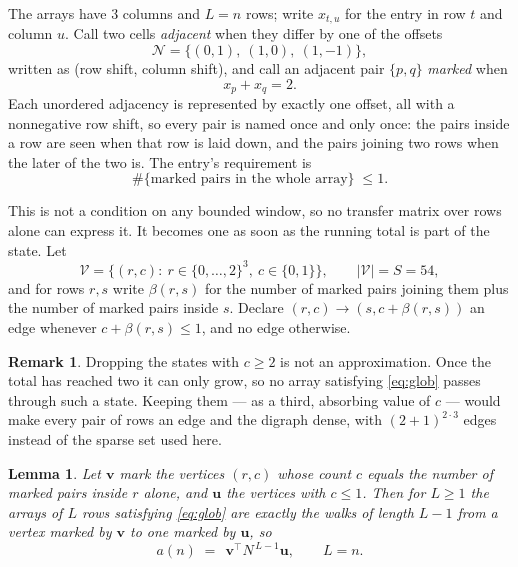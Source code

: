 \documentclass[11pt,a4paper]{article}
\theoremstyle{plain}
\newtheorem{lemma}[theorem]{Lemma}
\theoremstyle{definition}
\newtheorem{remark}[theorem]{Remark}
\begin{document}
The arrays have $3$ columns and $L=n$ rows; write $x_{t,u}$ for the entry in
row $t$ and column $u$. Call two cells \emph{adjacent} when they differ by one of the
offsets
\[
\mathcal N=\{(0,1),\ (1,0),\ (1,-1)\},
\]
written as (row shift, column shift), and call an adjacent pair $\{p,q\}$
\emph{marked} when
\[
x_{p}+x_{q}=2 .
\]
Each unordered adjacency is represented by exactly one offset, all with a nonnegative row
shift, so every pair is named once and only once: the pairs inside a row are seen when
that row is laid down, and the pairs joining two rows when the later of the two is. The
entry's requirement is
\begin{equation}\label{eq:glob}
\#\{\text{marked pairs in the whole array}\}\;\le1.
\end{equation}

This is not a condition on any bounded window, so no transfer matrix over rows alone can
express it. It becomes one as soon as the running total is part of the state. Let
\[
\mathcal V=\bigl\{(r,c):\ r\in\{0,\dots,2\}^{3},\ c\in\{0,1\}\bigr\},
\qquad |\mathcal V|=S=54,
\]
and for rows $r,s$ write $\beta(r,s)$ for the number of marked pairs joining them plus the
number of marked pairs inside $s$. Declare $(r,c)\to(s,c+\beta(r,s))$ an edge whenever
$c+\beta(r,s)\le1$, and no edge otherwise.

\begin{remark}
Dropping the states with $c\ge2$ is not an approximation. Once the total has reached two it
can only grow, so no array satisfying \eqref{eq:glob} passes through such a state. Keeping
them --- as a third, absorbing value of $c$ --- would make every pair of rows an edge and
the digraph dense, with $(2+1)^{2\cdot3}$ edges instead of the sparse set used here.
\end{remark}

\begin{lemma}\label{lem:walk}
Let $\mathbf{v}$ mark the vertices $(r,c)$ whose count $c$ equals the number of marked pairs
inside $r$ alone, and $\mathbf{u}$ the vertices with $c\le1$. Then for $L\ge1$ the arrays
of $L$ rows satisfying \eqref{eq:glob} are exactly the walks of length $L-1$ from a
vertex marked by $\mathbf{v}$ to one marked by $\mathbf{u}$, so
\[
a(n)\;=\;\,\mathbf{v}^{\!\top}N^{\,L-1}\mathbf{u},\qquad L=n .
\]
\end{lemma}
\end{document}
